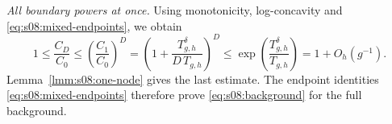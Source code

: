 \begin{prf}
\smallskip\noindent
\emph{All boundary powers at once.}
Using monotonicity, log-concavity and
\eqref{eq:s08:mixed-endpoints}, we obtain
\begin{equation}\label{eq:s08:background-squeeze}
 1\leq\frac{C_D}{C_0}
 \leq\left(\frac{C_1}{C_0}\right)^D
 =\left(1+\frac{T_{g,h}^{\delta}}{D\,T_{g,h}}\right)^D
 \leq \exp\left(\frac{T_{g,h}^{\delta}}{T_{g,h}}\right)
 =1+O_h(g^{-1}).
\end{equation}
Lemma~\ref{lmm:s08:one-node} gives the last estimate.
The endpoint identities \eqref{eq:s08:mixed-endpoints} therefore
prove \eqref{eq:s08:background} for the full background.
\end{prf}
